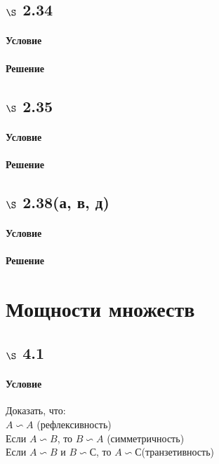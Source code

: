 \documentclass[a4paper,12pt]{article}
\begin{document}
\subsection*{$\S$ 2.34}
\paragraph*{Условие}
\paragraph*{Решение}

\subsection*{$\S$ 2.35}
\paragraph*{Условие}
\paragraph*{Решение}

\subsection*{$\S$ 2.38(а, в, д)}
\paragraph*{Условие}
\paragraph*{Решение}

\section{Мощности множеств}
\subsection*{$\S$ 4.1}
\paragraph*{Условие}
Доказать, что:\\
$ A \backsim A $ (рефлексивность)\\
Если $ A \backsim B $, то $ B \backsim A $ (симметричность)\\
Если $ A \backsim B $ и $ B \backsim С $, то $ A \backsim С $(транзетивность)
\end{document}
